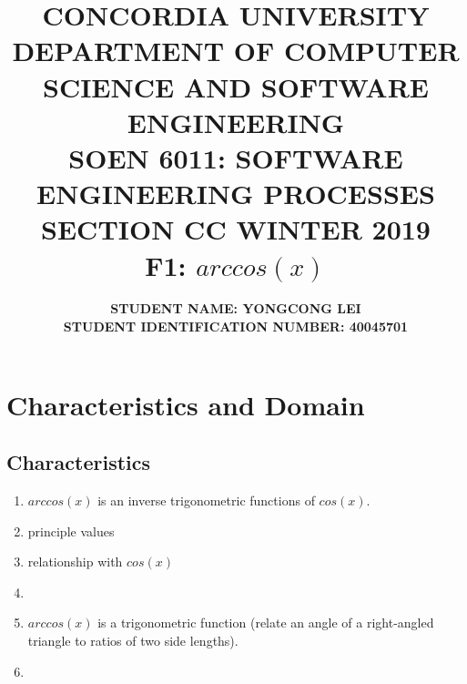 \documentclass[10pt]{article}
\title{{\large \textbf{CONCORDIA UNIVERSITY \\ DEPARTMENT OF COMPUTER SCIENCE AND SOFTWARE ENGINEERING \\ SOEN 6011: SOFTWARE ENGINEERING PROCESSES \\ SECTION CC WINTER 2019 \\ F1: $arccos(x)$}  \\ }}
\author{\normalsize \textbf {STUDENT NAME: YONGCONG LEI} \\ \normalsize \textbf{STUDENT IDENTIFICATION NUMBER: 40045701 }}
\date{}
\begin{document}
\maketitle

\section{Characteristics and Domain}
\subsection{Characteristics}

\begin{enumerate}
    \item $arccos(x)$ is an inverse trigonometric functions of $cos(x)$.
    \item principle values
    \item relationship with $cos(x)$
    \item 
    
    \item $arccos(x)$ is a trigonometric function (relate an angle of a right-angled triangle to ratios of two side lengths).
    \item 
\end{enumerate}
\end{document}
